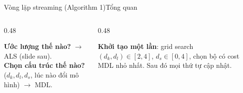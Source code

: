 \begin{frame}{Vòng lặp streaming (Algorithm 1)}{Tổng quan}
\vspace{6mm}
\begin{columns}[T,onlytextwidth]
\begin{column}{0.48\textwidth}
\begin{intuition}
  \small \textbf{Ước lượng thế nào?} $\rightarrow$ ALS (slide sau).\\
  \textbf{Chọn cấu trúc thế nào?} ($d_k,d_l,d_s$, lúc nào đổi mô hình) $\rightarrow$ MDL.
\end{intuition}
\end{column}
\begin{column}{0.48\textwidth}
\begin{questioncard}
  \small\textbf{Khởi tạo một lần}: grid search $(d_k,d_l)\in[2,4]$, $d_s\in[0,4]$, chọn bộ có cost MDL nhỏ nhất. Sau đó mọi thứ tự cập nhật.
\end{questioncard}
\end{column}
\end{columns}
\vfill
{}
\end{frame}

